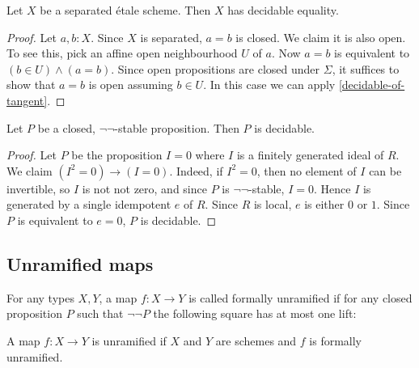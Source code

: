 \begin{proposition}%
	Let $X$ be a separated \'{e}tale scheme. Then $X$ has decidable equality.
\end{proposition}

\begin{proof}
	Let $a, b : X$. Since $X$ is separated, $a = b$ is closed.
	We claim it is also open.
	To see this, pick an affine open neighbourhood $U$ of $a$.
	Now $a = b$ is equivalent to $(b \in U) \wedge (a = b)$.
	Since open propositions are closed under $\Sigma$,
	it suffices to show that $a = b$ is open assuming $b \in U$.
	In this case we can apply \cref{decidable-of-tangent}.
\end{proof}

\begin{proposition}%
	Let $P$ be a closed, $\neg \neg$-stable proposition. Then $P$ is decidable.
\end{proposition}
\begin{proof}
	Let $P$ be the proposition $I = 0$ where $I$ is a finitely generated ideal of $R$.
	We claim $(I^2 = 0) \to (I = 0)$. Indeed, if $I^2 = 0$, then no element of $I$
	can be invertible, so $I$ is not not zero, and since $P$ is $\neg \neg$-stable,
	$I = 0$. Hence $I$ is
	generated by a single idempotent $e$ of $R$.
	Since $R$ is local, $e$ is either $0$ or $1$. Since $P$ is equivalent to $e = 0$,
	$P$ is decidable.
\end{proof}

\subsection{Unramified maps}

\begin{definition}
For any types $X,Y$, a map $f:X\to Y$ is called formally unramified if for any closed proposition $P$ such that $\neg\neg P$ the following square has at most one lift:
 \begin{center}
    \end{center}
\end{definition}

\begin{definition}
A map $f:X\to Y$ is unramified if $X$ and $Y$ are schemes and $f$ is formally unramified.
\end{definition}

